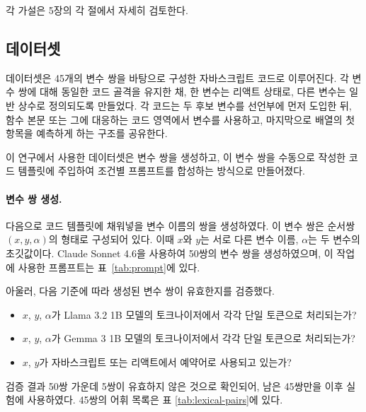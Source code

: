 \documentclass[11pt]{article}
\begin{document}
각 가설은 5장의 각 절에서 자세히 검토한다.

\subsection{데이터셋}
\label{sec:method-dataset}

데이터셋은 45개의 변수 쌍을 바탕으로 구성한 자바스크립트 코드로 이루어진다.
각 변수 쌍에 대해 동일한 코드 골격을 유지한 채, 한 변수는 리액트 상태로, 다른 변수는 일반 상수로 정의되도록 만들었다.
각 코드는 두 후보 변수를 선언부에 먼저 도입한 뒤, 함수 본문 또는 그에 대응하는 코드 영역에서 변수를 사용하고, 마지막으로 배열의 첫 항목을 예측하게 하는 구조를 공유한다.

이 연구에서 사용한 데이터셋은 변수 쌍을 생성하고, 이 변수 쌍을 수동으로 작성한 코드 템플릿에 주입하여 조건별 프롬프트를 합성하는 방식으로 만들어졌다.

\paragraph{변수 쌍 생성.}
다음으로 코드 템플릿에 채워넣을 변수 이름의 쌍을 생성하였다.
이 변수 쌍은 순서쌍 $(x, y, \alpha)$의 형태로 구성되어 있다.
이때 $x$와 $y$는 서로 다른 변수 이름, $\alpha$는 두 변수의 초깃값이다.
Claude Sonnet 4.6\citep{claude}을 사용하여 50쌍의 변수 쌍을 생성하였으며, 이 작업에 사용한 프롬프트는 표~\ref{tab:prompt}에 있다.

아울러, 다음 기준에 따라 생성된 변수 쌍이 유효한지를 검증했다.

\begin{itemize}
  \item $x$, $y$, $\alpha$가 Llama 3.2 1B 모델의 토크나이저에서 각각 단일 토큰으로 처리되는가?
  \item $x$, $y$, $\alpha$가 Gemma 3 1B 모델의 토크나이저에서 각각 단일 토큰으로 처리되는가?
  \item $x$, $y$가 자바스크립트 또는 리액트에서 예약어로 사용되고 있는가?
\end{itemize}

검증 결과 50쌍 가운데 5쌍이 유효하지 않은 것으로 확인되어, 남은 45쌍만을 이후 실험에 사용하였다.
45쌍의 어휘 목록은 표 \ref{tab:lexical-pairs}에 있다.
\end{document}
